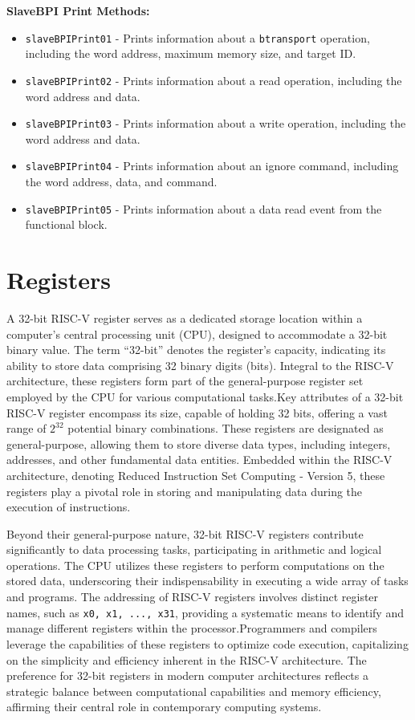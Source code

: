 \documentclass[a4paper,12pt,english]{report}
\begin{document}
\textbf{SlaveBPI Print Methods:}
\begin{itemize}
    \item \texttt{slaveBPIPrint01} - Prints information about a \texttt{b\textunderscore transport} operation, including the word address, maximum memory size, and target ID.
    \item \texttt{slaveBPIPrint02} - Prints information about a read operation, including the word address and data.
    \item \texttt{slaveBPIPrint03} - Prints information about a write operation, including the word address and data.
    \item \texttt{slaveBPIPrint04} - Prints information about an ignore command, including the word address, data, and command.
    \item \texttt{slaveBPIPrint05} - Prints information about a data read event from the functional block.
\end{itemize}

\section{Registers}


A 32-bit RISC-V register serves as a dedicated storage location within a computer's central processing unit (CPU), designed to accommodate a 32-bit binary value. The term ``32-bit'' denotes the register's capacity, indicating its ability to store data comprising 32 binary digits (bits). Integral to the RISC-V architecture, these registers form part of the general-purpose register set employed by the CPU for various computational tasks.Key attributes of a 32-bit RISC-V register encompass its size, capable of holding 32 bits, offering a vast range of $2^{32}$ potential binary combinations. These registers are designated as general-purpose, allowing them to store diverse data types, including integers, addresses, and other fundamental data entities. Embedded within the RISC-V architecture, denoting Reduced Instruction Set Computing - Version 5, these registers play a pivotal role in storing and manipulating data during the execution of instructions.

Beyond their general-purpose nature, 32-bit RISC-V registers contribute significantly to data processing tasks, participating in arithmetic and logical operations. The CPU utilizes these registers to perform computations on the stored data, underscoring their indispensability in executing a wide array of tasks and programs. The addressing of RISC-V registers involves distinct register names, such as \texttt{x0, x1, ..., x31}, providing a systematic means to identify and manage different registers within the processor.Programmers and compilers leverage the capabilities of these registers to optimize code execution, capitalizing on the simplicity and efficiency inherent in the RISC-V architecture. The preference for 32-bit registers in modern computer architectures reflects a strategic balance between computational capabilities and memory efficiency, affirming their central role in contemporary computing systems.
\end{document}
